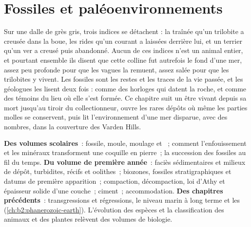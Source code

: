 \chapter{Fossiles et paléoenvironnements}\label{ch:b2:palaeoenvironments}

Sur une dalle de grès gris, trois indices se détachent : la traînée qu'un trilobite a creusée dans la boue,
les rides qu'un courant a laissées derrière lui, et un terrier qu'un ver a creusé puis abandonné. Aucun de ces
indices n'est un animal entier, et pourtant ensemble ils disent que cette colline fut autrefois le fond d'une
mer, assez peu profonde pour que les vagues la remuent, assez salée pour que les trilobites y vivent. Les
fossiles sont les restes et les traces de la vie passée, et les géologues les lisent deux fois : comme des
horloges qui datent la roche, et comme des témoins du lieu où elle s'est formée. Ce chapitre suit un être vivant
depuis sa mort jusqu'au tiroir du collectionneur, ouvre les rares dépôts où même les parties molles se
conservent, puis lit l'environnement d'une mer disparue, avec des nombres, dans la couverture des Varden Hills.

\begin{recall}
\textbf{Des volumes scolaires}~: fossile, moule, moulage et ~; comment l'enfouissement et les
minéraux transforment une coquille en pierre~; la succession des fossiles au fil du temps.
\textbf{Du volume de première année}~: faciès sédimentaires et milieux de dépôt, turbidites, récifs et oolithes~; biozones,
fossiles stratigraphiques et datums de première apparition~; compaction, décompaction, loi d'Athy et épaisseur
solide d'une couche~; ciment~; accommodation. \textbf{Des chapitres précédents}~: transgressions et
régressions, le niveau marin à long terme et les  (\cref{ch:b2:phanerozoic-earth}).
L'évolution des espèces et la classification des animaux et des plantes relèvent des volumes de biologie.
\end{recall}


